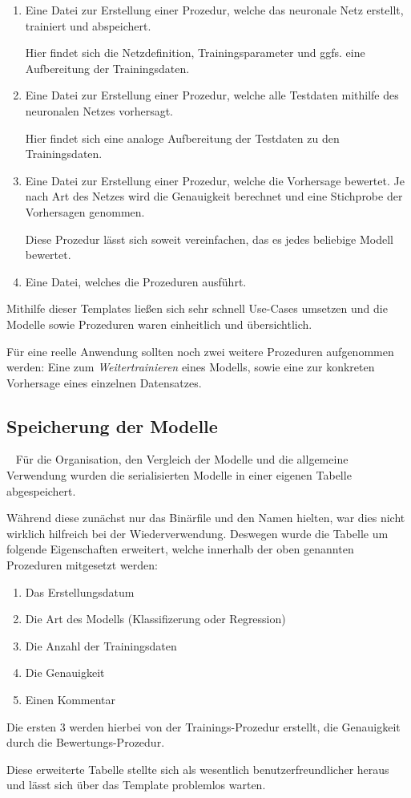 \begin{enumerate}
	\item Eine Datei zur Erstellung einer Prozedur, welche das neuronale Netz erstellt, trainiert und abspeichert.
	
	Hier findet sich die Netzdefinition, Trainingsparameter und ggfs. eine Aufbereitung der Trainingsdaten.
	\item Eine Datei zur Erstellung einer Prozedur, welche alle Testdaten mithilfe des neuronalen Netzes vorhersagt.
	
	Hier findet sich eine analoge Aufbereitung der Testdaten zu den Trainingsdaten.
	\item Eine Datei zur Erstellung einer Prozedur, welche die Vorhersage bewertet. Je nach Art des Netzes wird die Genauigkeit berechnet und eine Stichprobe der Vorhersagen genommen.
	
	Diese Prozedur lässt sich soweit vereinfachen, das es jedes beliebige Modell bewertet.
	\item Eine Datei, welches die Prozeduren ausführt.
\end{enumerate}

Mithilfe dieser Templates ließen sich sehr schnell Use-Cases umsetzen und die Modelle sowie Prozeduren waren einheitlich und übersichtlich. 

Für eine reelle Anwendung sollten noch zwei weitere Prozeduren aufgenommen werden: Eine zum \textit{Weitertrainieren} eines Modells, sowie eine zur konkreten Vorhersage eines einzelnen Datensatzes. 

\subsection{Speicherung der Modelle} ~\newline
Für die Organisation, den Vergleich der Modelle und die allgemeine Verwendung wurden die serialisierten Modelle in einer eigenen Tabelle abgespeichert. 

Während diese zunächst nur das Binärfile und den Namen hielten, war dies nicht wirklich hilfreich bei der Wiederverwendung. Deswegen wurde die Tabelle um folgende Eigenschaften erweitert, welche innerhalb der oben genannten Prozeduren mitgesetzt werden:

\begin{enumerate}
	\item Das Erstellungsdatum
	\item Die Art des Modells (Klassifizerung oder Regression)
	\item Die Anzahl der Trainingsdaten
	\item Die Genauigkeit
	\item Einen Kommentar
\end{enumerate}

Die ersten 3 werden hierbei von der Trainings-Prozedur erstellt, die Genauigkeit durch die Bewertungs-Prozedur.

Diese erweiterte Tabelle stellte sich als wesentlich benutzerfreundlicher heraus und lässt sich über das Template problemlos warten. 